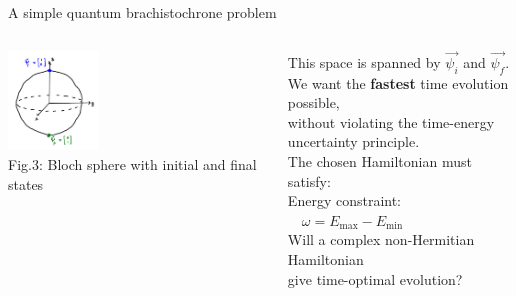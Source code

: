 \documentclass[10pt]{beamer}
\begin{document}
\begin{frame}{A simple quantum brachistochrone problem}
\begin{columns}
    \hspace{1.5em}
    \begin{column}{\textwidth}
    \includegraphics[width=0.35\textwidth]{bloch.png}\\
    \tiny{Fig.3: Bloch sphere with initial and final states}
    \end{column}
    \begin{column}{0.8\textwidth}
    \hspace{-20em}
    This space is spanned by $\vec{\psi_i}$ and $\vec{\psi_f}.$\\
    \vspace{0.4cm}
    \hspace{-20em}
    \pause
    We want the \textbf{fastest} time evolution possible,\\
    \hspace{-20em}
    without violating the time-energy uncertainty principle.\\
    \vspace{0.4cm}
    \pause
    \hspace{-20em}
    The chosen Hamiltonian must satisfy:\\
    \hspace{-20em}
    \textcolor{myNewColorD}{Energy constraint:}\\
    \hspace{-20em}
    \textcolor{myNewColorD}{$\quad\omega  = E_{\mathrm{max}} - E_{\mathrm{min}}$}\\
    \vspace{0.7cm}
    \pause
    \hspace{-18em}
    \textcolor{myNewColorC}{Will a complex non-Hermitian Hamiltonian}\\
    \hspace{-18em}
    \textcolor{myNewColorC}{give time-optimal evolution?}
    \end{column}
    \end{columns}
\end{frame}
\end{document}
